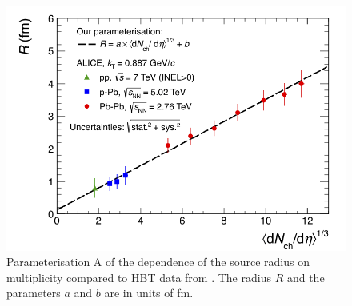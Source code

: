 \begin{figure}[htbp]
\begin{center}
\includegraphics[width=\columnwidth]{HbtRadiusParam.png}
\caption{Parameterisation A of the dependence of the source radius on multiplicity compared to HBT data from \cite{Adam:2015vna, Adam:2015pya, Abelev:2012sq}. The radius $R$ and the parameters $a$ and $b$ are in units of fm.}
\label{fig:radiiparam}
\end{center}
\end{figure}

